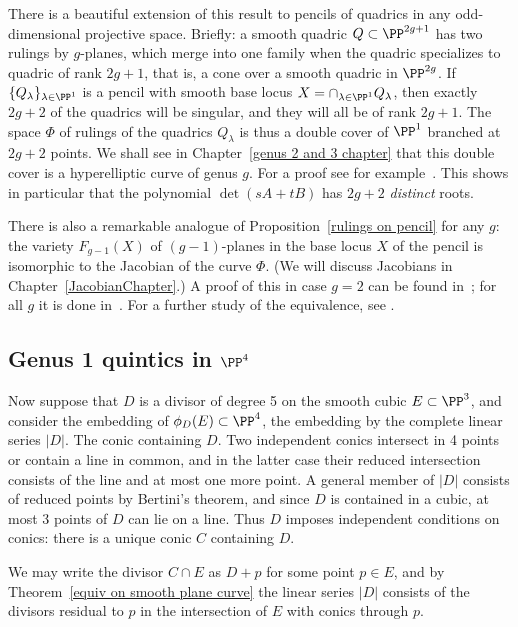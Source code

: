\begin{fact}
 There is a beautiful extension of this result to pencils of quadrics in any odd-dimensional projective space. Briefly: a smooth quadric $Q \subset \PP^{2g+1}$ has two rulings by $g$-planes, which merge into one family when the quadric specializes to quadric of rank $2g+1$, that is, a cone over a smooth quadric in $\PP^{2g}$. If $\{Q_\lambda\}_{\lambda \in \PP^1}$ is a pencil with smooth base locus $X = \cap_{\lambda \in \PP^1} Q_\lambda$, then exactly $2g+2$ of the quadrics will be singular, and they will all be of rank $2g+1$. The space $\Phi$ of rulings of the quadrics $Q_\lambda$ is thus a double cover of $\PP^1$ branched at $2g+2$  points. We shall see in Chapter~\ref{genus 2 and 3 chapter} that this double cover is a hyperelliptic curve of genus $g$. For a proof see for example~\cite[Proposition 22.34]{Harris1995}.
 This shows in particular that the polynomial $\det(sA+tB)$ has $2g+2$ \emph{distinct} roots. 

 There is also a remarkable analogue of Proposition~\ref{rulings on pencil} for any $g$: the variety $F_{g-1}(X)$ of $(g-1)$-planes in the base locus $X$ of the pencil is isomorphic to the Jacobian of the  curve $\Phi$. (We will discuss Jacobians in Chapter~\ref{JacobianChapter}.) A proof of this in case $g=2$ can be found in~\cite{Griffiths-Harris1978}; for all $g$ it is done in~\cite{Donagi}. For a further study of the equivalence, see \cite{Eisenbud-Schreyer}.
\end{fact}

\subsection{Genus 1 quintics in $\PP^4$} \label{g=1 in P4}

Now suppose that $D$ is a divisor of degree 5 on the smooth cubic $E\subset \PP^3$, and consider the embedding of
$\phi_D(E)\subset \PP^4$, the embedding by the complete linear series $|D|$. The conic containing $D$. Two independent
conics intersect in 4 points or contain a line in common, and in the latter case their reduced intersection consists of the line
and at most one more point. A general member of $|D|$ consists of reduced points by Bertini's theorem, and since $D$ is
contained in a cubic, at most 3 points of $D$ can lie on a line. Thus $D$ imposes independent conditions on conics: there is a unique conic $C$ containing $D$.

We may write the divisor $C\cap E$ as $D+p$ for some point $p\in E$, and by Theorem~\ref{equiv on smooth plane curve} 
the linear series $|D|$ consists of the divisors residual to $p$ in the intersection of $E$ with conics through $p$.

